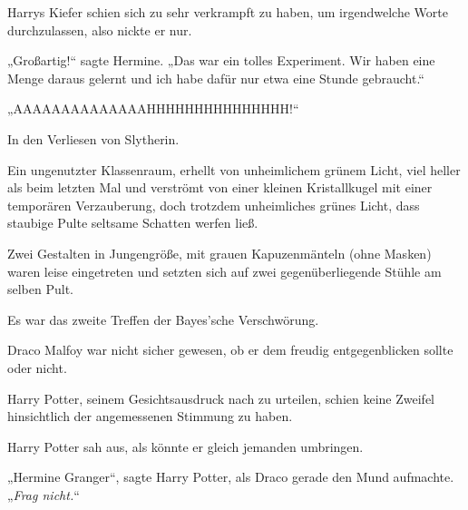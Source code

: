 Harrys Kiefer schien sich zu sehr verkrampft zu haben, um irgendwelche Worte durchzulassen, also nickte er nur.

„Großartig!“ sagte Hermine.
„Das war ein tolles Experiment. Wir haben eine Menge daraus gelernt und ich habe dafür nur etwa eine Stunde gebraucht.“

„AAAAAAAAAAAAAAHHHHHHHHHHHHHHH!“

\later

In den Verliesen von Slytherin.

Ein ungenutzter Klassenraum, erhellt von unheimlichem grünem Licht, viel heller als beim letzten Mal und verströmt von einer kleinen Kristallkugel mit einer temporären Verzauberung, doch trotzdem unheimliches grünes Licht, dass staubige Pulte seltsame Schatten werfen ließ.

Zwei Gestalten in Jungengröße, mit grauen Kapuzenmänteln (ohne Masken) waren leise eingetreten und setzten sich auf zwei gegenüberliegende Stühle am selben Pult.

Es war das zweite Treffen der Bayes’sche Verschwörung.

Draco Malfoy war nicht sicher gewesen, ob er dem freudig entgegenblicken sollte oder nicht.

Harry Potter, seinem Gesichtsausdruck nach zu urteilen, schien keine Zweifel hinsichtlich der angemessenen Stimmung zu haben.

Harry Potter sah aus, als könnte er gleich jemanden umbringen.

„Hermine Granger“, sagte Harry Potter, als Draco gerade den Mund aufmachte.
„\emph{Frag nicht.}“

